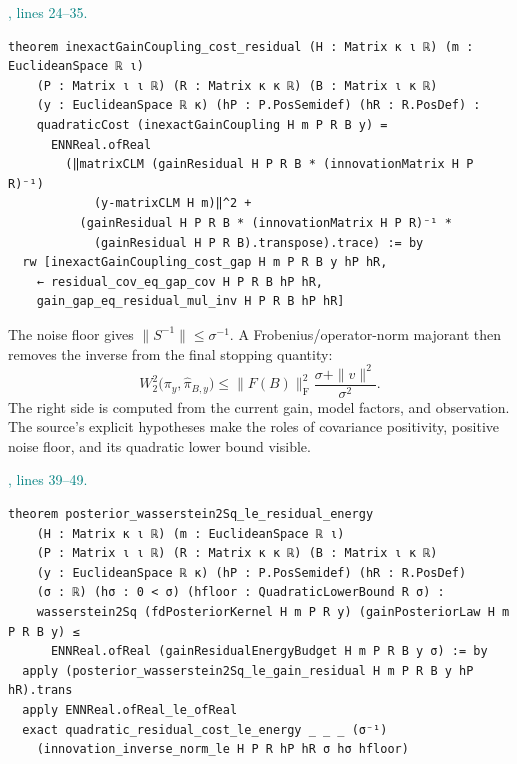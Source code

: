 \documentclass[11pt]{article}\usepackage{needspace}\renewcommand{\paperkind}{Lean companion}\setlength{\parskip}{0.35em}
\begin{document}


{\small\textcolor{teal}{, lines 24--35.}\par}

\begin{lstlisting}[style=BayesSource]
theorem inexactGainCoupling_cost_residual (H : Matrix κ ι ℝ) (m : EuclideanSpace ℝ ι)
    (P : Matrix ι ι ℝ) (R : Matrix κ κ ℝ) (B : Matrix ι κ ℝ)
    (y : EuclideanSpace ℝ κ) (hP : P.PosSemidef) (hR : R.PosDef) :
    quadraticCost (inexactGainCoupling H m P R B y) =
      ENNReal.ofReal
        (‖matrixCLM (gainResidual H P R B * (innovationMatrix H P R)⁻¹)
            (y-matrixCLM H m)‖^2 +
          (gainResidual H P R B * (innovationMatrix H P R)⁻¹ *
            (gainResidual H P R B).transpose).trace) := by
  rw [inexactGainCoupling_cost_gap H m P R B y hP hR,
    ← residual_cov_eq_gap_cov H P R B hP hR,
    gain_gap_eq_residual_mul_inv H P R B hP hR]
\end{lstlisting}

The noise floor gives $\|S^{-1}\|\le\sigma^{-1}$. A Frobenius/operator-norm majorant then removes the inverse from the final stopping quantity:
\[
 W_2^2\bigl(\pi_y,\widehat\pi_{B,y}\bigr)
 \le\|F(B)\|_{\mathrm F}^2\frac{\sigma+\|v\|^2}{\sigma^2}.
\]
The right side is computed from the current gain, model factors, and observation. The source's explicit hypotheses make the roles of covariance positivity, positive noise floor, and its quadratic lower bound visible.



{\small\textcolor{teal}{, lines 39--49.}\par}

\begin{lstlisting}[style=BayesSource]
theorem posterior_wasserstein2Sq_le_residual_energy
    (H : Matrix κ ι ℝ) (m : EuclideanSpace ℝ ι)
    (P : Matrix ι ι ℝ) (R : Matrix κ κ ℝ) (B : Matrix ι κ ℝ)
    (y : EuclideanSpace ℝ κ) (hP : P.PosSemidef) (hR : R.PosDef)
    (σ : ℝ) (hσ : 0 < σ) (hfloor : QuadraticLowerBound R σ) :
    wasserstein2Sq (fdPosteriorKernel H m P R y) (gainPosteriorLaw H m P R B y) ≤
      ENNReal.ofReal (gainResidualEnergyBudget H m P R B y σ) := by
  apply (posterior_wasserstein2Sq_le_gain_residual H m P R B y hP hR).trans
  apply ENNReal.ofReal_le_ofReal
  exact quadratic_residual_cost_le_energy _ _ _ (σ⁻¹)
    (innovation_inverse_norm_le H P R hP hR σ hσ hfloor)
\end{lstlisting}
\end{document}
